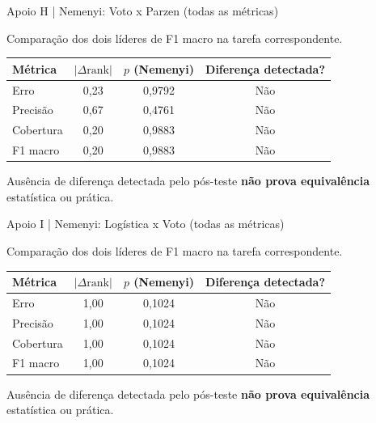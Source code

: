 \documentclass[aspectratio=169,11pt]{beamer}
\begin{document}
\begin{frame}[t]{Apoio H | Nemenyi: Voto x Parzen (todas as métricas)}

\small Comparação dos dois líderes de F1 macro na tarefa correspondente.\vspace{3mm}
\par
\small
\renewcommand{\arraystretch}{1.6}
\setlength{\tabcolsep}{4pt}
\centering
\begin{tabular}{lccc}
\toprule
Métrica & $|\Delta \mathrm{rank}|$ & $p$ (Nemenyi) & Diferença detectada? \\
\midrule
Erro & 0,23 & 0,9792 & Não \\
Precisão & 0,67 & 0,4761 & Não \\
Cobertura & 0,20 & 0,9883 & Não \\
F1 macro & 0,20 & 0,9883 & Não \\
\bottomrule
\end{tabular}
\par
\vspace{3mm}\begin{notabox}\small Ausência de diferença detectada pelo pós-teste \textbf{não prova equivalência} estatística ou prática.\end{notabox}

\end{frame}

\begin{frame}[t]{Apoio I | Nemenyi: Logística x Voto (todas as métricas)}

\small Comparação dos dois líderes de F1 macro na tarefa correspondente.\vspace{3mm}
\par
\small
\renewcommand{\arraystretch}{1.6}
\setlength{\tabcolsep}{4pt}
\centering
\begin{tabular}{lccc}
\toprule
Métrica & $|\Delta \mathrm{rank}|$ & $p$ (Nemenyi) & Diferença detectada? \\
\midrule
Erro & 1,00 & 0,1024 & Não \\
Precisão & 1,00 & 0,1024 & Não \\
Cobertura & 1,00 & 0,1024 & Não \\
F1 macro & 1,00 & 0,1024 & Não \\
\bottomrule
\end{tabular}
\par
\vspace{3mm}\begin{notabox}\small Ausência de diferença detectada pelo pós-teste \textbf{não prova equivalência} estatística ou prática.\end{notabox}

\end{frame}
\end{document}
